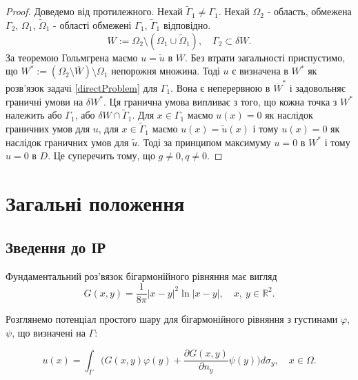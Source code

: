 \documentclass[12pt]{report}
\begin{document}
\begin{proof}

Доведемо від протилежного. Нехай $\tilde{\Gamma}_1\neq\Gamma_1$.
Нехай $\Omega_2$ - область, обмежена $\Gamma_2$, $\Omega_1$, $\tilde{\Omega}_1$ - області обмежені $\Gamma_1$, $\tilde{\Gamma}_1$ відповідно. 
\begin{equation}
W:=\Omega_2\setminus(\Omega_1\cup\tilde{\Omega}_1), \quad \Gamma_2\subset\delta W. \nonumber
\end{equation}
За теоремою Гольмгрена маємо $u = \tilde{u}$ в $W$. Без втрати загальності приспустимо, що $W^{*}:=(\Omega_2\setminus \overline{W})\setminus\Omega_1$ непорожня множина. Тоді $u$ є визначена в $W^{*}$ як розв'язок задачі \eqref{directProblem} для $\Gamma_1$. Вона є неперервною в $\overline{W}^{*}$ і задовольняє граничні умови на $\delta W^{*}$. Ця гранична умова випливає з того, що кожна точка з $W^{*}$ належить або $\Gamma_1$, або $\delta W\cap\tilde{\Gamma}_1$. Для $x\in\Gamma_1$ маємо $u(x)=0$ як наслідок граничних умов для $u$, для $x\in\tilde{\Gamma}_1$ маємо $u(x)=\tilde{u}(x)$ і тому $u(x)=0$ як наслідок граничних умов для $\tilde{u}$. Тоді за принципом максимуму $u=0$ в $W^{*}$ і тому $u=0$ в $D$. Це суперечить тому, що $g\neq 0, q\neq 0$.

\end{proof}


\setcounter{secnumdepth}{1}
\chapter{Загальні положення}

\section{Зведення до ІР}

Фундаментальний роз'вязок бігармонійного рівняння має вигляд
 \begin{equation}
 	G(x, y)=\frac{1}{8\pi}|x-y|^2\ln|x-y|, \quad x,\ y \in \mathbb{R}^2.
 \end{equation}

Розглянемо потенціал простого шару для бігармонійного рівняння з густинами $\varphi$, $\psi$, що визначені на $\Gamma$:

\begin{equation}
	 	u(x)=\int_{\Gamma}\bigg(G(x,y)\varphi(y)+\frac{\partial G(x,y)}{\partial n_y}\psi(y)\bigg)d\sigma_y, \quad x\in \Omega. \nonumber
\end{equation}
\end{document}
